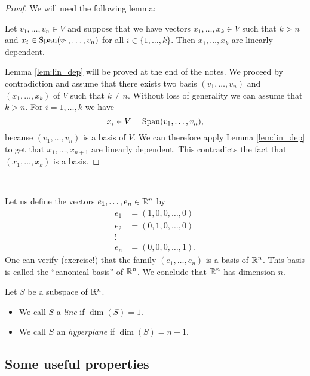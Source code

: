 \documentclass[11pt,nocut]{article}
\begin{document}
\begin{proof}
	We will need the following lemma:
	\begin{lemma}\label{lem:lin_dep}
		Let $v_1, \dots, v_n \in V$ and suppose that we have vectors $x_1, \dots, x_k \in V$ such that $k > n$ and $x_i \in {{\rm Span}}(v_1, \dots, v_n)$ for all $i \in \{1, \dots, k\}$.
		Then $x_1, \dots, x_k$ are linearly dependent.
	\end{lemma}
	Lemma \ref{lem:lin_dep} will be proved at the end of the notes.
	We proceed by contradiction and assume that there exists two basis $(v_1, \dots, v_n)$ and $(x_1, \dots, x_k)$ of $V$ such that $k \neq n$. Without loss of generality we can assume that $k > n$. For $i = 1, \dots, k$ we have
	$$
	x_i \in V = {{\rm Span}}(v_1, \dots, v_n),
	$$
	because $(v_1, \dots, v_n)$ is a basis of $V$. We can therefore apply Lemma \ref{lem:lin_dep} to get that $x_1, \dots, x_{n+1}$ are linearly dependent. This contradicts the fact that $(x_1, \dots, x_{k})$ is a basis.
\end{proof}
\\

\begin{example}
	Let us define the vectors $e_1, \dots, e_n \in \mathbb{R}^n$ by
	\begin{align*}
		e_1 &= (1, 0, 0, \dots, 0) \\
		e_2 &= (0, 1, 0, \dots, 0) \\
		\vdots & \\
		e_n &= (0, 0, 0, \dots, 1).
	\end{align*}
	One can verify (exercise!) that the family $(e_1, \dots, e_n)$ is a basis of $\mathbb{R}^n$. This basis is called the ``canonical basis'' of $\mathbb{R}^n$. We conclude that $\mathbb{R}^n$ has dimension $n$.
\end{example}
\vspace{0.5cm}

\begin{definition}
	Let $S$ be a subspace of $\mathbb{R}^n$.
	\begin{itemize}
		\item We call $S$ a \emph{line} if $\dim(S) = 1$.
		\item We call $S$ an \emph{hyperplane} if $\dim(S) = n-1$.
	\end{itemize}
\end{definition}

\subsection{Some useful properties}
\end{document}

